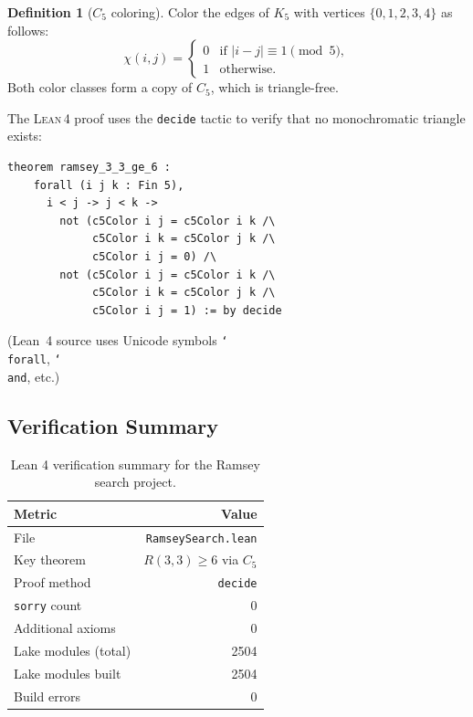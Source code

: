 \documentclass[11pt,a4paper]{article}
\theoremstyle{definition}
\newtheorem{definition}[theorem]{Definition}
\theoremstyle{remark}
\newcommand{\lean}{\textsc{Lean\,4}}
\newcommand{\sorry}{\texttt{sorry}}
\begin{document}
\begin{definition}[$C_5$ coloring]
Color the edges of $K_5$ with vertices $\{0,1,2,3,4\}$ as follows:
\[
  \chi(i,j) = \begin{cases}
    0 & \text{if } |i-j| \equiv 1 \pmod{5}, \\
    1 & \text{otherwise.}
  \end{cases}
\]
Both color classes form a copy of $C_5$, which is triangle-free.
\end{definition}

The \lean{} proof uses the \texttt{decide} tactic to verify that no
monochromatic triangle exists:
\begin{verbatim}
theorem ramsey_3_3_ge_6 :
    forall (i j k : Fin 5),
      i < j -> j < k ->
        not (c5Color i j = c5Color i k /\
             c5Color i k = c5Color j k /\
             c5Color i j = 0) /\
        not (c5Color i j = c5Color i k /\
             c5Color i k = c5Color j k /\
             c5Color i j = 1) := by decide
\end{verbatim}
\noindent (Lean~4 source uses Unicode symbols
\texttt{\char`\\forall}, \texttt{\char`\\and}, etc.)

\subsection{Verification Summary}\label{sec:lean-summary}

\begin{table}[ht]
\centering
\caption{Lean 4 verification summary for the Ramsey search project.}\label{tab:lean}
\begin{tabular}{@{}lr@{}}
\toprule
\textbf{Metric} & \textbf{Value} \\
\midrule
File & \texttt{RamseySearch.lean} \\
Key theorem & $R(3,3) \ge 6$ via $C_5$ \\
Proof method & \texttt{decide} \\
\sorry{} count & 0 \\
Additional axioms & 0 \\
Lake modules (total) & 2504 \\
Lake modules built & 2504 \\
Build errors & 0 \\
\bottomrule
\end{tabular}
\end{table}
\end{document}
